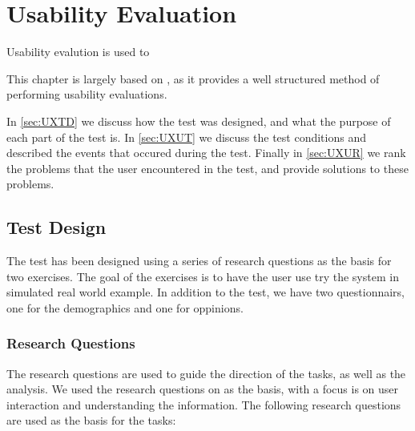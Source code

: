 \chapter{Usability Evaluation}\label{cha:usability}

Usability evalution is used to 

This chapter is largely based on \citep[p. 65-72 and 269-275]{UXBook}, as
it provides a well structured method of performing usability evaluations.\nl

In \autoref{sec:UXTD} we discuss how the test was designed, and what the
purpose of each part of the test is. In \autoref{sec:UXUT} we discuss the test
conditions and described the events that occured during the test.
Finally in \autoref{sec:UXUR} we rank the problems that the user encountered in
the test, and provide solutions to these problems.


\section{Test Design}\label{sec:UXTD}
The test has been designed using a series of research questions as the basis
for two exercises. The goal of the exercises is to have the user use try the
system in simulated real world example. In addition to the test, we have two
questionnairs, one for the demographics and one for oppinions.

\subsection{Research Questions}\label{subsec:UXRQ}
The research questions are used to guide the direction of the tasks, as well as
the analysis. We used the research questions on \citep[p. 70-71]{UXBook} as the
basis, with a focus is on user interaction and understanding the information.
The following research questions are used as the basis for the tasks:

